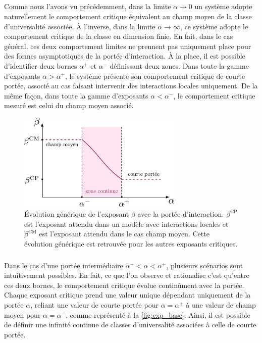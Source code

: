 \subparagraph{}Comme nous l'avons vu précédemment, dans la limite $\alpha \rightarrow 0$ un système adopte naturellement le comportement critique équivalent au champ moyen de la classe d'universalité associée. \`A l'inverse, dans la limite $\alpha \rightarrow \infty$, ce système adopte le comportement critique de la classe en dimension finie. En fait, dans le cas général, ces deux comportement limites ne prennent pas uniquement place pour des formes asymptotiques de la portée d'interaction. \`A la place, il est possible d'identifier deux bornes $\alpha^+$ et $\alpha^-$ définissant deux zones. Dans toute la gamme d'exposants $\alpha>\alpha^+$, le système présente son comportement critique de courte portée, associé au cas faisant intervenir des interactions locales uniquement. De la même façon, dans toute la gamme d'exposants $\alpha < \alpha^-$, le comportement critique mesuré est celui du champ moyen associé.

\begin{figure}[h]
	\centering
	\includegraphics[width=0.7\textwidth]{Chapitre1/Figures/LongRange/beta_base.pdf}
	\caption{Évolution générique de l'exposant $\beta$ avec la portée d'interaction. $\beta^\text{CP}$ est l'exposant attendu dans un modèle avec interactions locales et $\beta^\text{CM}$ est l'exposant attendu dans le cas champ moyen. Cette évolution générique est retrouvée pour les autres exposants critiques.}
	\label{fig:exp_base}
\end{figure}

\subparagraph{}Dans le cas d'une portée intermédiaire $\alpha^- < \alpha < \alpha^+$, plusieurs scénarios sont intuitivement possibles. En fait, ce que l'on observe et rationalise c'est qu'entre ces deux bornes, le comportement critique évolue continûment avec la portée. Chaque exposant critique prend une valeur unique dépendant uniquement de la portée $\alpha$, reliant une valeur de courte portée pour $\alpha = \alpha^+$ à une valeur de champ moyen pour $\alpha = \alpha^-$, comme représenté à la \autoref{fig:exp_base}. Ainsi, il est possible de définir une infinité continue de classes d'universalité associées à celle de courte portée.

